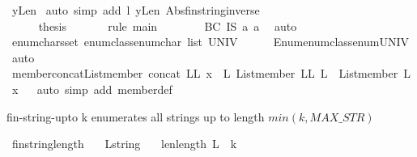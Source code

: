 \begin{isabellebody}
\ yLen\ \isamarkupfalse%
{\isacharparenleft}auto\ simp\ add{\isacharcolon}\ l\ yLen\ Abs{\isacharunderscore}fin{\isacharunderscore}string{\isacharunderscore}inverse{\isacharparenright}\isanewline
\ \ \ \ \ \ \ \ \isamarkupfalse%
\isanewline
\ \ \ \ \ \ \ \ \isamarkupfalse%
\isanewline
\ \ \ \ \ \ \isamarkupfalse%
\isanewline
\ \ \ \ \isamarkupfalse%
\ {\isacharquery}thesis\isanewline
\ \ \ \ \ \ \isamarkupfalse%
{\isacharparenleft}rule\ main{\isacharparenright}\isanewline
\ \ \ \ \ \ \isamarkupfalse%
\ BC\ IS\ a{}\ a{}\ \isamarkupfalse%
\ auto\isanewline
\ \ \isamarkupfalse%
\isanewline
\ \ \isamarkupfalse%
%
\endisatagproof
{\isafoldproof}%
%
\isadelimproof
\isanewline
%
\endisadelimproof
\isanewline
{}\isamarkupfalse%
\ enum{\isacharunderscore}chars{\isacharcolon}{\isachardoublequoteopen}set\ {\isacharparenleft}enum{\isacharunderscore}class{\isachardot}enum{\isacharcolon}{\isacharcolon}char\ list{\isacharparenright}{\isacharequal}\ UNIV{\isachardoublequoteclose}\isanewline
%
\isadelimproof
\ \ %
\endisadelimproof
%
\isatagproof
{}\isamarkupfalse%
\ \ \ Enum{\isachardot}enum{\isacharunderscore}class{\isachardot}enum{\isacharunderscore}UNIV\ \isamarkupfalse%
\ auto%
\endisatagproof
{\isafoldproof}%
%
\isadelimproof
\isanewline
%
\endisadelimproof
\isanewline
{}\isamarkupfalse%
\ member{\isacharunderscore}concat{\isacharcolon}{\isachardoublequoteopen}List{\isachardot}member\ {\isacharparenleft}concat\ LL{\isacharparenright}\ x\ {\isacharequal}\ {\isacharparenleft}{\isasymexists}L{\isachardot}\ List{\isachardot}member\ LL\ L\ {\isasymand}\ List{\isachardot}member\ L\ x{\isacharparenright}{\isachardoublequoteclose}\isanewline
%
\isadelimproof
\ \ %
\endisadelimproof
%
\isatagproof
{}\isamarkupfalse%
{\isacharparenleft}auto\ simp\ add{\isacharcolon}\ member{\isacharunderscore}def{\isacharparenright}%
\endisatagproof
{\isafoldproof}%
%
\isadelimproof
%
\endisadelimproof
%
\begin{isamarkuptext}%
fin-string-upto k enumerates all strings up to length $min(k,MAX\_STR)$%
\end{isamarkuptext}\isamarkuptrue%
\isamarkupfalse%
\ fin{\isacharunderscore}string{\isacharunderscore}length{\isacharcolon}\isanewline
\ \ \ L{\isacharcolon}{\isacharcolon}string\isanewline
\ \ \ len{\isacharcolon}{\isachardoublequoteopen}length\ L\ {\isasymle}\ k{\isachardoublequoteclose}\isanewline

\end{isabellebody}
